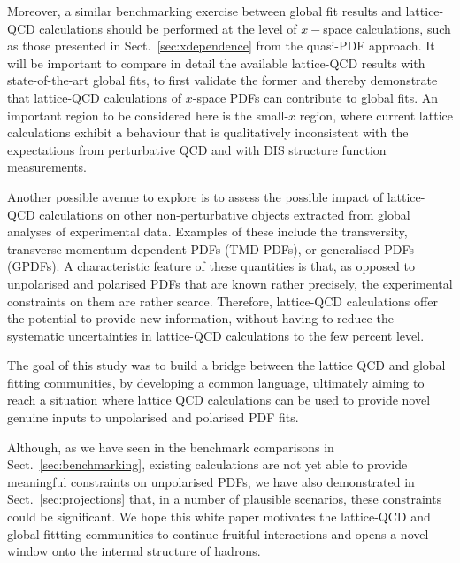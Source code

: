Moreover, a similar benchmarking exercise between global fit results and lattice-QCD calculations should
be performed at the level of
$x-$space calculations, such as those presented in Sect.~\ref{sec:xdependence}
from the quasi-PDF approach.
%
It will be important to compare in detail the available lattice-QCD results with
state-of-the-art global fits, to first validate the former and
thereby demonstrate that lattice-QCD calculations of $x$-space PDFs can contribute to
global fits.
%
An important region to be considered here is the small-$x$ region, where current lattice
calculations exhibit a behaviour that is qualitatively inconsistent with
the expectations from perturbative QCD and with DIS structure function measurements.

Another possible avenue to explore is to assess
the possible impact of lattice-QCD calculations on other non-perturbative objects
extracted from global analyses of experimental data.
%
Examples of these include the transversity, transverse-momentum dependent PDFs (TMD-PDFs),
or generalised PDFs (GPDFs).
%
A characteristic feature of these quantities is that, as opposed to unpolarised and
polarised PDFs that are known rather precisely, the experimental constraints on them
are rather scarce. Therefore, lattice-QCD calculations offer the potential
to provide new information, without having to reduce the systematic uncertainties 
in lattice-QCD calculations to the few percent level.

The goal of this study was to build a bridge between the lattice QCD
and global fitting communities, by developing a common language, ultimately
aiming to reach a situation where lattice QCD calculations can be used to 
provide novel genuine inputs to unpolarised and polarised PDF fits.

Although, as we have seen in the benchmark comparisons in 
Sect.~\ref{sec:benchmarking}, existing calculations are not yet able to 
provide meaningful constraints on unpolarised PDFs, we have also demonstrated 
in Sect.~\ref{sec:projections} that, in a number
of plausible scenarios, these constraints could be significant.
%
We hope this white paper motivates the lattice-QCD and global-fittting
communities to continue fruitful interactions and opens a novel
window onto the internal structure of hadrons.
